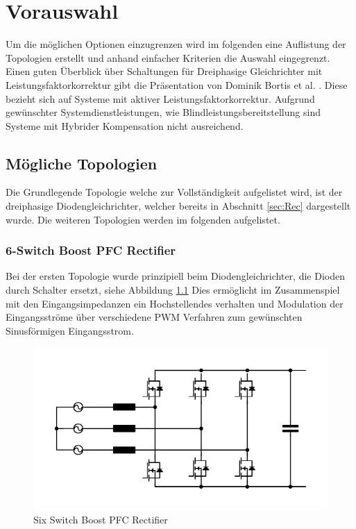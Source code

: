\chapter{Vorauswahl}
Um die möglichen Optionen einzugrenzen wird im folgenden eine Auflistung der Topologien erstellt und anhand einfacher Kriterien die Auswahl eingegrenzt. Einen guten Überblick über Schaltungen für Dreiphasige Gleichrichter mit Leistungsfaktorkorrektur gibt die Präsentation von Dominik Bortis et al. \cite{Advanced3PhPFC}. Diese bezieht sich auf Systeme mit aktiver Leistungsfaktorkorrektur. Aufgrund gewünschter Systemdienstleistungen, wie Blindleistungsbereitstellung sind Systeme mit Hybrider Kompensation nicht ausreichend.


\section{Mögliche Topologien}
Die Grundlegende Topologie welche zur Vollständigkeit aufgelistet wird, ist der dreiphasige Diodengleichrichter, welcher bereits in Abschnitt \ref{sec:Rec} dargestellt wurde. Die weiteren Topologien werden im folgenden aufgelistet.
	\subsection{6-Switch Boost PFC Rectifier}
			Bei der ersten Topologie wurde prinzipiell beim Diodengleichrichter, die Dioden durch Schalter ersetzt, siehe Abbildung \ref{fig:sixswitchboost} Dies ermöglicht im Zusammenspiel mit den Eingangsimpedanzen ein Hochstellendes verhalten und Modulation der Eingangsströme über verschiedene \gls{PWM} Verfahren zum gewünschten Sinusförmigen Eingangsstrom.
			\begin{figure}
				\centering
				\includegraphics[width=0.7\linewidth]{content/Grafiken/SixSwitchBoost}
				\caption{Six Switch Boost PFC Rectifier}
				\label{fig:sixswitchboost}
			\end{figure}
			
